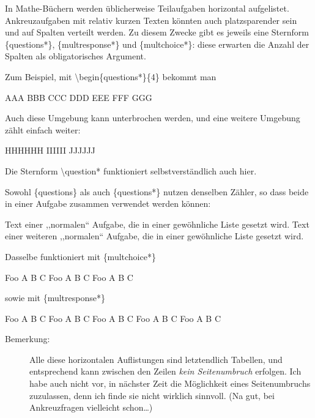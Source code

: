 \documentclass[hyperworksheet]{drcschool}
\newcommand*{\cs}[1]{\textup{\ttfamily\textbackslash#1}}                        %
\newcommand*{\env}[1]{\textup{\ttfamily\{#1\}}}                                 %
\begin{document}

\begin{worksheet}

In Mathe-Büchern werden üblicherweise Teilaufgaben horizontal aufgelistet. Ankreuzaufgaben
mit relativ kurzen Texten könnten auch platzsparender sein und auf Spalten verteilt werden.
Zu diesem Zwecke gibt es jeweils eine Sternform \env{questions*}, \env{multresponse*} und
\env{multchoice*}: diese erwarten die Anzahl der Spalten als obligatorisches Argument.

Zum Beispiel, mit \cs{begin\{questions*\}\{4\}} bekommt man
\begin{questions*}{4}
\question AAA
\question* BBB
\question CCC
\question* DDD
\question EEE
\question FFF
\question GGG
\end{questions*}
Auch diese Umgebung kann unterbrochen werden, und eine weitere Umgebung
zählt einfach weiter:
\begin{questions*}{3}
\question HHHHHH
\question IIIIII
\question JJJJJJ
\end{questions*}
Die Sternform \cs{question*} funktioniert selbstverständlich auch hier.

Sowohl \env{questions} als auch \env{questions*} nutzen denselben Zähler, so
dass beide in einer Aufgabe zusammen verwendet werden können:
\begin{questions}
\question Text einer ,,normalen`` Aufgabe, die in einer gewöhnliche Liste gesetzt wird.
\question Text einer weiteren ,,normalen`` Aufgabe, die in einer gewöhnliche Liste gesetzt wird.
\end{questions}

\exercise[Ankreuzaufgaben]
Dasselbe funktioniert mit \env{multchoice*}
\begin{multchoice*}{3}
\question Foo
   \choice* A
   \choice B
   \choice C
\question Foo
   \choice A
   \choice B
   \choice* C
\question Foo
   \choice A
   \choice* B
   \choice C
\end{multchoice*}
sowie mit \env{multresponse*}
\begin{multresponse*}{3}
\question Foo
   \choice* A
   \choice B
   \choice* C
\question Foo
   \choice A
   \choice B
   \choice* C
\question Foo
   \choice* A
   \choice* B
   \choice C
\question Foo
   \choice A
   \choice* B
   \choice* C
\question Foo
   \choice A
   \choice* B
   \choice C
\end{multresponse*}

\begin{description}
\item[Bemerkung:]
Alle diese horizontalen Auflistungen sind letztendlich Tabellen, und entsprechend
kann zwischen den Zeilen \emph{kein Seitenumbruch} erfolgen. Ich habe auch nicht
vor, in nächster Zeit die Möglichkeit eines Seitenumbruchs zuzulassen, denn ich
finde sie nicht wirklich sinnvoll. (Na gut, bei Ankreuzfragen vielleicht schon\ldots)
\end{description}

\end{worksheet}
\end{document}
